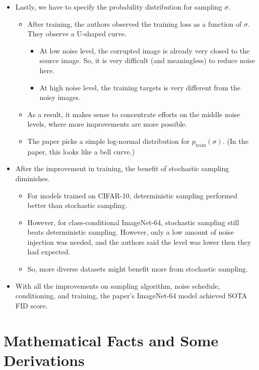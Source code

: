 \documentclass[10pt]{article}
\newcommand{\mrm}[1]{\mathrm{#1}}
\begin{document}
\begin{itemize}
  \item Lastly, we have to specify the probability distribution for sampling $\sigma$.
  \begin{itemize}
    \item After training, the authors observed the training loss as a function of $\sigma$. They observe a U-shaped curve.
    \begin{itemize}
      \item At low noise level, the corrupted image is already very closed to the source image. So, it is very difficult (and meaningless) to reduce noise here.
      \item At high noise level, the training targets is very different from the noisy images.
    \end{itemize}
    \item As a result, it makes sense to concentrate efforts on the middle noise levels, where more improvements are more possible.
    \item The paper picks a simple log-normal distribution for $p_{\mrm{train}}(\sigma)$. (In the paper, this looks like a bell curve.)
  \end{itemize}

  \item After the improvement in training, the benefit of stochastic sampling diminishes.
  \begin{itemize}
    \item For models trained on CIFAR-10, deterministic sampling performed better than stochastic sampling. 
    \item However, for class-conditional ImageNet-64, stochastic sampling still beats deterministic sampling. However, only a low amount of noise injection was needed, and the authors said the level was lower then they had expected.
    \item So, more diverse datasets might benefit more from stochastic sampling.
  \end{itemize}

  \item With all the improvements on sampling algorithm, noise schedule, conditioning, and training, the paper's ImageNet-64 model achieved SOTA FID score.
\end{itemize}

\appendix

\section{Mathematical Facts and Some Derivations}
\end{document}
